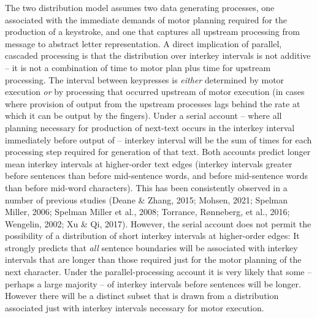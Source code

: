 \documentclass[
  man,floatsintext]{apa7}
\begin{document}
The two distribution model assumes two data generating processes, one associated with the immediate demands of motor planning required for the production of a keystroke, and one that captures all upstream processing from message to abstract letter representation. A direct implication of parallel, cascaded processing is that the distribution over interkey intervals is not additive -- it is not a combination of time to motor plan plus time for upstream processing. The interval between keypresses is \emph{either} determined by motor execution \emph{or} by processing that occurred upstream of motor execution (in cases where provision of output from the upstream processes lags behind the rate at which it can be output by the fingers). Under a serial account -- where all planning necessary for production of next-text occurs in the interkey interval immediately before output of -- interkey interval will be the sum of times for each processing step required for generation of that text. Both accounts predict longer mean interkey intervals at higher-order text edges (interkey intervals greater before sentences than before mid-sentence words, and before mid-sentence words than before mid-word characters). This has been consistently observed in a number of previous studies (Deane \& Zhang, 2015; Mohsen, 2021; Spelman Miller, 2006; Spelman Miller et al., 2008; Torrance, Rønneberg, et al., 2016; Wengelin, 2002; Xu \& Qi, 2017). However, the serial account does not permit the possibility of a distribution of short interkey intervals at higher-order edges: It strongly predicts that \emph{all} sentence boundaries will be associated with interkey intervals that are longer than those required just for the motor planning of the next character. Under the parallel-processing account it is very likely that some -- perhaps a large majority -- of interkey intervals before sentences will be longer. However there will be a distinct subset that is drawn from a distribution associated just with interkey intervals necessary for motor execution.
\end{document}
